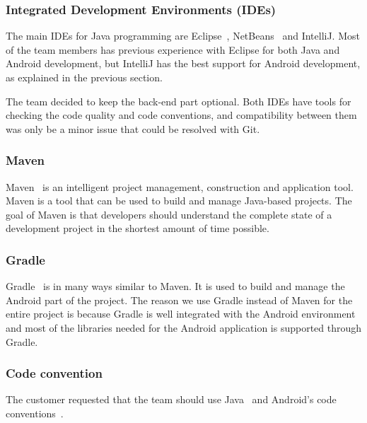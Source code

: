 \subsubsection{Integrated Development Environments (IDEs)}
The main IDEs for Java programming are Eclipse~\cite{eclipse}, NetBeans~\cite{netbeans} and IntelliJ. Most of the team members has previous experience with Eclipse for both Java and Android development, but IntelliJ has the best support for Android development, as explained in the previous section.

The team decided to keep the back-end part optional. Both IDEs have tools for checking the code quality and code conventions, and compatibility between them was only be a minor issue that could be resolved with Git.

\subsubsection{Maven}
Maven~\cite{maven} is an intelligent project management, construction and application tool. Maven is a tool that can be used to build and manage Java-based projects. The goal of Maven is that developers should understand the complete state of a development project in the shortest amount of time possible.

\subsubsection{Gradle}
Gradle~\cite{Gradle} is in many ways similar to Maven. It is used to build and manage the Android part of the project. The reason we use Gradle instead of Maven for the entire project is because Gradle is well integrated with the Android environment and most of the libraries needed for the Android application is supported through Gradle.

\subsubsection{Code convention}
The customer requested that the team should use Java~\cite{javaconv} and Android's code conventions~\cite{Androidconv}.
